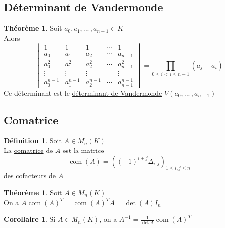 \documentclass[10pt,a4paper]{article}
\theoremstyle{definition}
\newtheorem{theorem}[proposition]{Théorème}
\newtheorem{corollaire}[proposition]{Corollaire}
\newtheorem{definition}[proposition]{Définition}
\DeclareMathOperator{\com}{com}
\begin{document}
\subsection{Déterminant de Vandermonde}
\begin{theorem}
Soit $a_0, a_1, ...\,, a_{n - 1} \in K$ \\
Alors
\[ \begin{vmatrix}
1 & 1 & 1 & \cdots & 1 \\
a_0 & a_1 & a_2 & \cdots & a_{n - 1} \\
a_0^2 & a_1^2 & a_2^2 & \cdots & a_{n - 1}^2 \\
\vdots & \vdots & \vdots & & \vdots \\
a_0^{n - 1} & a_1^{n - 1} & a_2^{n - 1} & \cdots & a_{n - 1}^{n - 1}
\end{vmatrix} = \prod_{0 \leq i < j \leq n - 1} (a_j - a_i)\]
Ce déterminant est le \uline{déterminant de Vandermonde} $V(a_0, ...\,, a_{n - 1})$
\end{theorem}

\subsection{Comatrice}
\begin{definition}
Soit $A \in M_n(K)$ \\
La \uline{comatrice} de $A$ est la matrice
\[\com(A) = \left((-1)^{i + j} \Delta_{i, j}\right)_{1 \leq i, j \leq n}\]
des cofacteurs de $A$
\end{definition}
\begin{theorem}
Soit $A \in M_n(K)$ \\
On a $A \com(A)^T = \com(A)^T A = \det(A) I_n$
\end{theorem}
\begin{corollaire}
Si $A \in M_n(K)$, on a $A^{-1} = \frac{1}{\det A} \com(A)^T$
\end{corollaire}
\end{document}
